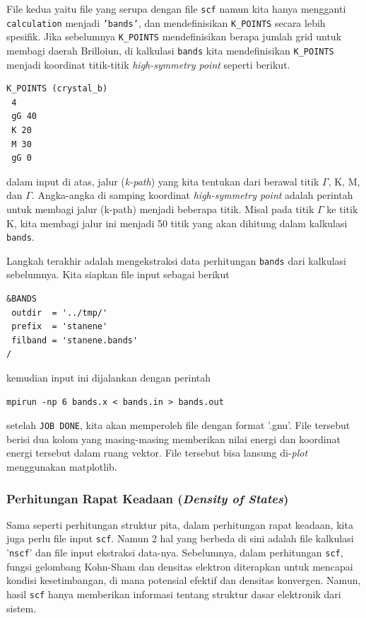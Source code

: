 File kedua yaitu file yang serupa dengan file \texttt{scf} namun kita hanya mengganti \texttt{calculation} menjadi \texttt{'bands'}, dan mendefinisikan \texttt{K\_POINTS} secara lebih spesifik. Jika sebelumnya \texttt{K\_POINTS} mendefinisikan berapa jumlah grid untuk membagi daerah Brilloiun, di kalkulasi \texttt{bands} kita mendefinisikan \texttt{K\_POINTS} menjadi koordinat titik-titik \textit{high-symmetry point} seperti berikut.
\begin{lstlisting}
K_POINTS (crystal_b)
 4
 gG 40
 K 20
 M 30
 gG 0
\end{lstlisting}
dalam input di atas, jalur (\textit{k-path}) yang kita tentukan dari berawal titik $\Gamma$, K, M, dan $\Gamma$. Angka-angka di samping koordinat \textit{high-symmetry point} adalah perintah untuk membagi jalur (k-path) menjadi beberapa titik. Misal pada titik $\Gamma$ ke titik K, kita membagi jalur ini menjadi 50 titik yang akan dihitung dalam kalkulasi \texttt{bands}.

Langkah terakhir adalah mengekstraksi data perhitungan \texttt{bands} dari kalkulasi sebelumnya. Kita siapkan file input sebagai berikut
\begin{lstlisting}
&BANDS
 outdir  = '../tmp/'
 prefix  = 'stanene'
 filband = 'stanene.bands'
/

\end{lstlisting}
kemudian input ini dijalankan dengan perintah
\begin{lstlisting}
mpirun -np 6 bands.x < bands.in > bands.out
\end{lstlisting}
setelah \texttt{JOB DONE}, kita akan memperoleh file dengan format '.gnu'. File tersebut berisi dua kolom yang masing-masing memberikan nilai energi dan koordinat energi  tersebut dalam ruang vektor. File tersebut bisa lansung di-\textit{plot} menggunakan matplotlib.

\subsubsection{Perhitungan Rapat Keadaan (\textit{Density of States})}
Sama seperti perhitungan struktur pita, dalam perhitungan rapat keadaan, kita juga perlu file input \texttt{scf}. Namun 2 hal yang berbeda di sini adalah file kalkulasi '\texttt{nscf}' dan file input ekstraksi data-nya. Sebelumnya, dalam perhitungan \texttt{scf}, fungsi gelombang Kohn-Sham dan densitas elektron diterapkan untuk mencapai kondisi kesetimbangan, di mana potensial efektif dan densitas konvergen. Namun, hasil \texttt{scf} hanya memberikan informasi tentang struktur dasar elektronik dari sistem.

